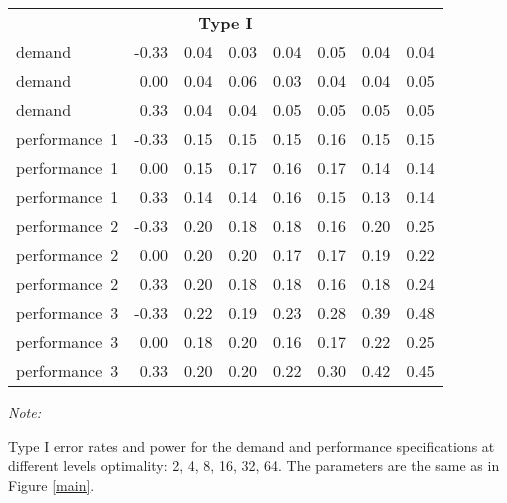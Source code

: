\begin{table}
\begin{threeparttable}
\begin{tabular}[t]{lrrrrrrr}
\multicolumn{8}{c}{\textbf{Type I}}\\
\hspace{1em}demand & -0.33 & 0.04 & 0.03 & 0.04 & 0.05 & 0.04 & 0.04\\
\hspace{1em}demand & 0.00 & 0.04 & 0.06 & 0.03 & 0.04 & 0.04 & 0.05\\
\hspace{1em}demand & 0.33 & 0.04 & 0.04 & 0.05 & 0.05 & 0.05 & 0.05\\
\hspace{1em}performance~1 & -0.33 & 0.15 & 0.15 & 0.15 & 0.16 & 0.15 & 0.15\\
\hspace{1em}performance~1 & 0.00 & 0.15 & 0.17 & 0.16 & 0.17 & 0.14 & 0.14\\
\hspace{1em}performance~1 & 0.33 & 0.14 & 0.14 & 0.16 & 0.15 & 0.13 & 0.14\\
\hspace{1em}performance~2 & -0.33 & 0.20 & 0.18 & 0.18 & 0.16 & 0.20 & 0.25\\
\hspace{1em}performance~2 & 0.00 & 0.20 & 0.20 & 0.17 & 0.17 & 0.19 & 0.22\\
\hspace{1em}performance~2 & 0.33 & 0.20 & 0.18 & 0.18 & 0.16 & 0.18 & 0.24\\
\hspace{1em}performance~3 & -0.33 & 0.22 & 0.19 & 0.23 & 0.28 & 0.39 & 0.48\\
\hspace{1em}performance~3 & 0.00 & 0.18 & 0.20 & 0.16 & 0.17 & 0.22 & 0.25\\
\hspace{1em}performance~3 & 0.33 & 0.20 & 0.20 & 0.22 & 0.30 & 0.42 & 0.45\\
\bottomrule
\end{tabular}
\begin{tablenotes}
\item \textit{Note: } 
\item Type I error rates and power for the demand 
            and performance specifications at different
            levels optimality: 2, 4, 8, 16, 32, 64. The
            parameters are the same as in Figure
            \ref{main}.
\end{tablenotes}
\end{threeparttable}
\end{table}